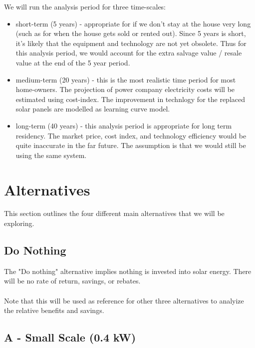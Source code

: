 \documentclass[10pt,letterpaper]{article}
\begin{document}
We will run the analysis period for three time-scales:

\begin{itemize}
	\item short-term (5 years) - appropriate for if we don't stay at the house very long (such as for when the house gets sold or rented out). Since 5 years is short, it's likely that the equipment and technology are not yet obsolete. Thus for this analysis period, we would account for the extra salvage value / resale value at the end of the 5 year period.\\

	\item medium-term (20 years) - this is the most realistic time period for most home-owners. The projection of power company electricity costs will be estimated using cost-index. The improvement in technlogy for the replaced solar panels are modelled as learning curve model.\\

	\item long-term (40 years) - this analysis period is appropriate for long term residency. The market price, cost index, and technology efficiency would be quite inaccurate in the far future. The assumption is that we would still be using the same system.
\end{itemize}

\section{Alternatives}\label{section:alternatives}

This section outlines the four different main alternatives that we will be exploring.\\

\subsection{Do Nothing}

The "Do nothing" alternative implies nothing is invested into solar energy. There will be no rate of return, savings, or rebates.\\
\\
Note that this will be used as reference for other three alternatives to analyize the relative benefits and savings.\\ 

\subsection{A - Small Scale (0.4 kW)}
\end{document}
